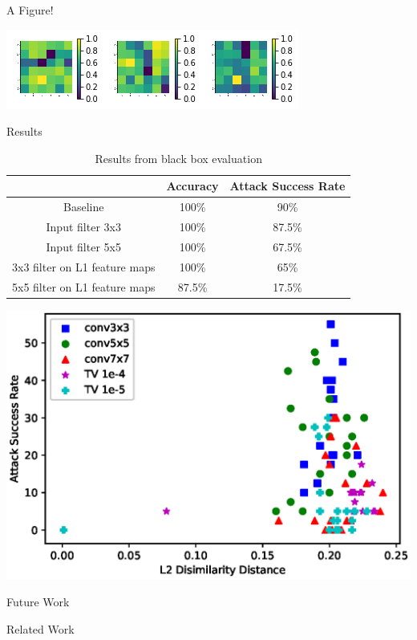 \documentclass{pharmposter}
\begin{document}
	\begin{sectionbox}{A Figure!}
		\begin{center}
			\includegraphics[scale=2.0]{higher_filters.png}
		\end{center}
	\end{sectionbox}

	\begin{sectionbox}{Results}
		\begin{table}[h!]
		  \begin{center}
		    \caption{Results from black box evaluation}
		    \label{tab:transfer}
		    \begin{tabular}{c|c|c} %
		      & \textbf{Accuracy} & \textbf{Attack Success Rate}\\
		      \hline
		      Baseline & 100\% & 90\%\\
		      Input filter 3x3 & 100\% & 87.5\%\\
		      Input filter 5x5 & 100\% & 67.5\%\\
		      3x3 filter on L1 feature maps & 100\% & 65\%\\
		      5x5 filter on L1 feature maps & 87.5\% & 17.5\%\\
		    \end{tabular}
		  \end{center}
		\end{table}

		\begin{center}
		\includegraphics[scale=1.5]{L2vsAttkplot.eps}
		\end{center}
	\end{sectionbox}

	\begin{sectionbox}{Future Work}
		\lipsum[3]
	\end{sectionbox}

	\begin{sectionbox}{Related Work}
		\lipsum[7-8]
	\end{sectionbox}
\end{document}
